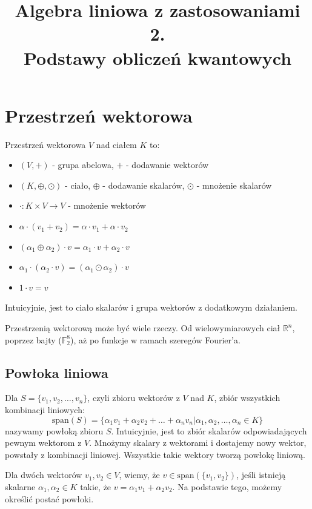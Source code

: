 \documentclass{../notatki}
\title{Algebra liniowa z zastosowaniami 2.\\ Podstawy obliczeń kwantowych}
\begin{document}
\section{Przestrzeń wektorowa}

Przestrzeń wektorowa $V$ nad ciałem $K$ to:
\begin{itemize}
  \item $(V, +)$ - grupa abelowa, $+$ - dodawanie wektorów
  \item $(K, \oplus, \odot)$ - ciało, $\oplus$ - dodawanie
    skalarów, $\odot$ - mnożenie skalarów
  \item $\cdot : K \times V \to V$ - mnożenie wektorów
  \item $
    \alpha \cdot (v_1 + v_2) = \alpha \cdot v_1 + \alpha \cdot v_2
    $
  \item $
    (\alpha_1 \oplus \alpha_2) \cdot v = \alpha_1 \cdot v + \alpha_2 \cdot v
    $
  \item $
    \alpha_1 \cdot (\alpha_2 \cdot v) = (\alpha_1 \odot \alpha_2) \cdot v
    $
  \item $
    1 \cdot v = v
    $
\end{itemize}
Intuicyjnie, jest to ciało skalarów i grupa wektorów z dodatkowym
działaniem.

\begin{examplebox}
  Przestrzenią wektorową może być wiele rzeczy. Od wielowymiarowych
  ciał $\mathbb{R}^n$, poprzez bajty ($\mathbb{F}_2^8$), aż po funkcje w ramach
  szeregów Fourier'a.
\end{examplebox}

\subsection{Powłoka liniowa}

Dla $S = \{v_1, v_2, \dots, v_n\}$, czyli zbioru wektorów z $V$ nad $K$,
zbiór wszystkich kombinacji liniowych:
$$
\mathrm{span}(S) = \{ \alpha_1 v_1 + \alpha_2 v_2 + \dots + \alpha_n
v_n | \alpha_1, \alpha_2, \dots, \alpha_n \in K \}
$$
nazywamy powłoką zbioru $S$. Intuicyjnie, jest to zbiór skalarów odpowiadających
pewnym wektorom z $V$. Mnożymy skalary z wektorami i dostajemy nowy wektor,
powstały z kombinacji liniowej. Wszystkie takie wektory tworzą powłokę liniową.

\begin{examplebox}
  Dla dwóch wektorów $v_1, v_2 \in V$, wiemy, że $v \in
  \mathrm{span}(\{v_1, v_2\})$, jeśli istnieją skalarne $\alpha_1,
  \alpha_2 \in K$ takie, że $v = \alpha_1 v_1 + \alpha_2 v_2$. Na podstawie
  tego, możemy określić postać powłoki.
\end{examplebox}
\end{document}
